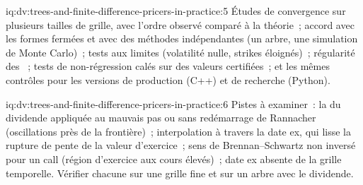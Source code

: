 \begin{solution}{iq:dv:trees-and-finite-difference-pricers-in-practice:5}
Études de convergence sur plusieurs tailles de grille, avec l'ordre observé comparé à la théorie~; accord avec les formes fermées et avec des méthodes indépendantes (un arbre, une
simulation de Monte Carlo)~; tests aux limites (volatilité nulle, strikes éloignés)~; régularité des ~; tests de non-régression calés sur des valeurs certifiées~; et les mêmes contrôles pour les
versions de production (C++) et de recherche (Python).
\end{solution}

\begin{solution}{iq:dv:trees-and-finite-difference-pricers-in-practice:6}
Pistes à examiner~: la  du dividende appliquée au mauvais pas ou sans redémarrage de Rannacher (oscillations près de la frontière)~; interpolation à travers la
date ex, qui lisse la rupture de pente de la valeur d'exercice~; sens de Brennan--Schwartz non inversé pour un call (région d'exercice aux cours élevés)~; date ex absente de la
grille temporelle. Vérifier chacune sur une grille fine et sur un arbre avec le dividende.
\end{solution}
